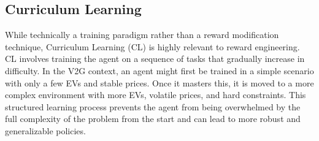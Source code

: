 \subsection{Curriculum Learning}
While technically a training paradigm rather than a reward modification technique, Curriculum Learning (CL) is highly relevant to reward engineering. CL involves training the agent on a sequence of tasks that gradually increase in difficulty. In the V2G context, an agent might first be trained in a simple scenario with only a few EVs and stable prices. Once it masters this, it is moved to a more complex environment with more EVs, volatile prices, and hard constraints. This structured learning process prevents the agent from being overwhelmed by the full complexity of the problem from the start and can lead to more robust and generalizable policies.